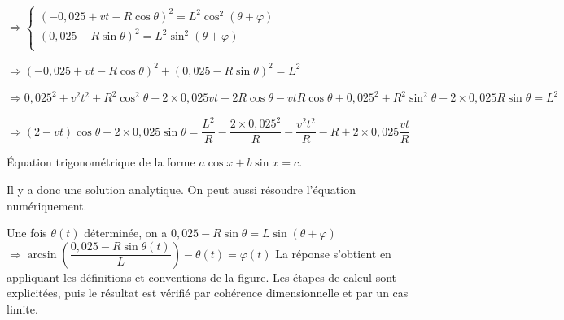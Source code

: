 \begin{corrigebox}
$\Rightarrow 
\left\{
\begin{array}{l}
\left(-0,025+vt- R\cos\theta\right)^2  =L^2\cos^2\left(\theta+\varphi\right)  \\
\left(0,025 - R \sin\theta  \right)^2= L^2\sin^2\left(\theta+\varphi\right)\\
\end{array}
\right.
$

$\Rightarrow 
\left(-0,025+vt- R\cos\theta\right)^2  + \left(0,025 - R \sin\theta  \right)^2 = L^2
$

$\Rightarrow 
0,025^2+v^2t^2+R^2\cos^2\theta -2\times 0,025 vt+2R\cos\theta-vtR\cos\theta
  + 0,025^2 + R^2 \sin^2\theta -2\times 0,025 R \sin\theta  =      L^2
$

$\Rightarrow 
\left(2-vt\right)\cos\theta  -2\times 0,025  \sin\theta  =      \dfrac{L^2}{R} - \dfrac{2\times0,025^2}{R}-\dfrac{v^2t^2}{R}-R +2\times 0,025 \dfrac{vt}{R}
$

Équation trigonométrique de la forme $a\cos x  + b\sin x =c$.

Il y a donc une solution analytique. On peut aussi résoudre l'équation numériquement.

Une fois $\theta(t)$ déterminée, on a $0,025 - R \sin\theta  = L\sin\left(\theta+\varphi\right)$ 
$\Rightarrow \arcsin\left(\dfrac{0,025 - R \sin\theta(t)}{L}\right)  - \theta(t) = \varphi(t)$
La réponse s'obtient en appliquant les définitions et conventions de la
    figure. Les étapes de calcul sont explicitées, puis le résultat est vérifié par
    cohérence dimensionnelle et par un cas limite.
\end{corrigebox}
